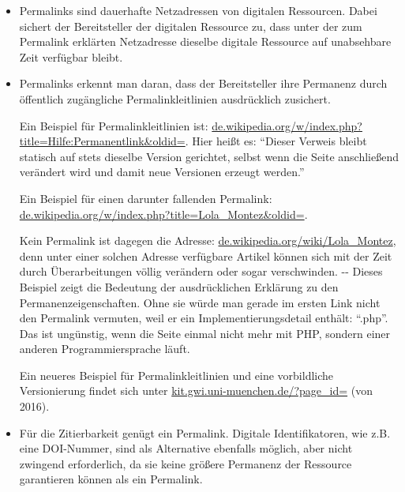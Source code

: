 \documentclass[12pt, a4paper]{article}
\begin{document}
\begin{itemize}
\item Permalinks sind dauerhafte Netzadressen von digitalen
  Ressourcen. Dabei sichert der Bereitsteller der digitalen Ressource
  zu, dass unter der zum Permalink erklärten Netzadresse
  dieselbe digitale Ressource auf unabsehbare Zeit verfügbar bleibt.

\item Permalinks erkennt man daran, dass der Bereitsteller ihre
  Permanenz durch öffentlich zugängliche Permalinkleitlinien
  ausdrücklich zusichert.

  Ein Beispiel für Permalinkleitlinien ist:
  \href{https://de.wikipedia.org/w/index.php?title=Hilfe:Permanentlink\&oldid=152277048}{de.\-wikipedia.\-org/\-w/\-index.php?\-title=\-Hilfe:\-Permanentlink\&\-oldid=}. Hier
  heißt es: "`Dieser Verweis bleibt statisch auf stets dieselbe
  Version gerichtet, selbst wenn die Seite anschließend verändert wird
  und damit neue Versionen erzeugt werden."'

  Ein Beispiel für einen darunter fallenden Permalink:
  \href{https://de.wikipedia.org/w/index.php?title=Lola_Montez\&oldid=154537216}{de.\-wikipedia.\-org/w\-/\-index.php?\-title=\-Lola\_Montez\&oldid=}.

  Kein Permalink ist dagegen die Adresse:
  \href{https://de.wikipedia.org/wiki/Lola_Montez}{de.\-wikipedia.\-org/\-wiki/\-Lola\_Montez},
  denn unter einer solchen Adresse verfügbare Artikel können sich mit der Zeit
  durch Überarbeitungen völlig verändern oder sogar verschwinden. -\/- Dieses Beispiel zeigt die
  Bedeutung der ausdrücklichen Erklärung zu den
  Permanenzeigenschaften. Ohne sie würde man gerade im ersten Link
  nicht den Permalink vermuten, weil er ein Implementierungsdetail
  enthält: "`.php"'. Das ist ungünstig, wenn die Seite einmal nicht
  mehr mit PHP, sondern einer anderen Programmiersprache läuft.

  Ein neueres Beispiel für Permalinkleitlinien und eine vorbildliche Versionierung
  findet sich unter \href{http://www.kit.gwi.uni-muenchen.de/?page\_id=2707}{kit.gwi.\-uni-muenchen.\-de/\-?page\_id=} (von 2016).

\item Für die Zitierbarkeit genügt ein Permalink. Digitale
  Identifikatoren, wie z.B. eine DOI-Nummer, sind als Alternative
  ebenfalls möglich, aber nicht zwingend erforderlich, da sie keine
  größere Permanenz der Ressource garantieren können als ein
  Permalink.


\end{itemize}
\end{document}
